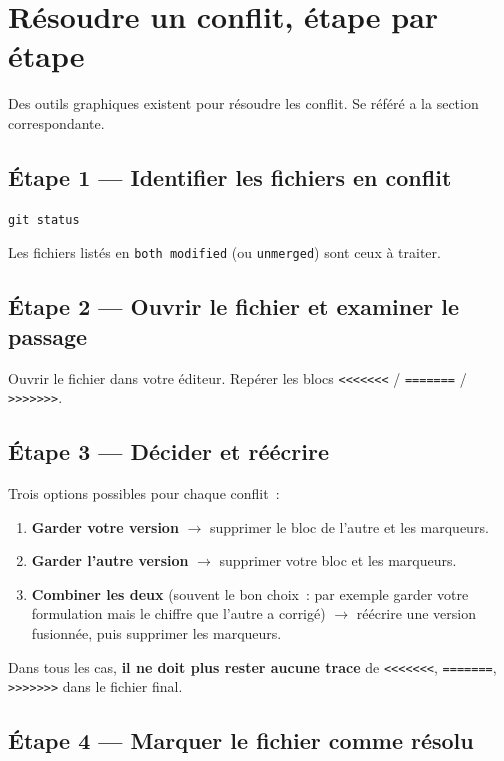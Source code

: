 \documentclass[11pt,a4paper]{article}
\begin{document}
\section{Résoudre un conflit, étape par étape}
\label{sec:resoudre}
Des outils graphiques existent pour résoudre les conflit. Se référé a la section correspondante. 
\subsection*{Étape 1 --- Identifier les fichiers en conflit}

\begin{lstlisting}[style=bashstyle]
git status
\end{lstlisting}

Les fichiers listés en \texttt{both modified} (ou \texttt{unmerged}) sont ceux à traiter.

\subsection*{Étape 2 --- Ouvrir le fichier et examiner le passage}

Ouvrir le fichier dans votre éditeur. Repérer les blocs \texttt{<<<<<<<} / \texttt{=======} / \texttt{>>>>>>>}.

\subsection*{Étape 3 --- Décider et réécrire}

Trois options possibles pour chaque conflit~:
\begin{enumerate}
  \item \textbf{Garder votre version} $\rightarrow$ supprimer le bloc de l'autre et les marqueurs.
  \item \textbf{Garder l'autre version} $\rightarrow$ supprimer votre bloc et les marqueurs.
  \item \textbf{Combiner les deux} (souvent le bon choix~: par exemple garder votre formulation mais le chiffre que l'autre a corrigé) $\rightarrow$ réécrire une version fusionnée, puis supprimer les marqueurs.
\end{enumerate}

Dans tous les cas, \textbf{il ne doit plus rester aucune trace} de \texttt{<<<<<<<}, \texttt{=======}, \texttt{>>>>>>>} dans le fichier final.

\subsection*{Étape 4 --- Marquer le fichier comme résolu}
\end{document}
